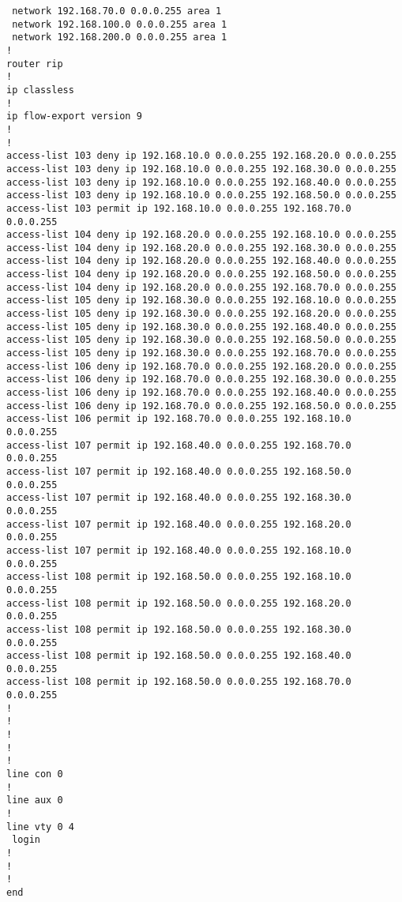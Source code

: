 \documentclass[a4paper,onecolumn,11pt]{article}
\begin{document}
{\begin{verbatim}
 network 192.168.70.0 0.0.0.255 area 1
 network 192.168.100.0 0.0.0.255 area 1
 network 192.168.200.0 0.0.0.255 area 1
!
router rip
!
ip classless
!
ip flow-export version 9
!
!
access-list 103 deny ip 192.168.10.0 0.0.0.255 192.168.20.0 0.0.0.255
access-list 103 deny ip 192.168.10.0 0.0.0.255 192.168.30.0 0.0.0.255
access-list 103 deny ip 192.168.10.0 0.0.0.255 192.168.40.0 0.0.0.255
access-list 103 deny ip 192.168.10.0 0.0.0.255 192.168.50.0 0.0.0.255
access-list 103 permit ip 192.168.10.0 0.0.0.255 192.168.70.0 0.0.0.255
access-list 104 deny ip 192.168.20.0 0.0.0.255 192.168.10.0 0.0.0.255
access-list 104 deny ip 192.168.20.0 0.0.0.255 192.168.30.0 0.0.0.255
access-list 104 deny ip 192.168.20.0 0.0.0.255 192.168.40.0 0.0.0.255
access-list 104 deny ip 192.168.20.0 0.0.0.255 192.168.50.0 0.0.0.255
access-list 104 deny ip 192.168.20.0 0.0.0.255 192.168.70.0 0.0.0.255
access-list 105 deny ip 192.168.30.0 0.0.0.255 192.168.10.0 0.0.0.255
access-list 105 deny ip 192.168.30.0 0.0.0.255 192.168.20.0 0.0.0.255
access-list 105 deny ip 192.168.30.0 0.0.0.255 192.168.40.0 0.0.0.255
access-list 105 deny ip 192.168.30.0 0.0.0.255 192.168.50.0 0.0.0.255
access-list 105 deny ip 192.168.30.0 0.0.0.255 192.168.70.0 0.0.0.255
access-list 106 deny ip 192.168.70.0 0.0.0.255 192.168.20.0 0.0.0.255
access-list 106 deny ip 192.168.70.0 0.0.0.255 192.168.30.0 0.0.0.255
access-list 106 deny ip 192.168.70.0 0.0.0.255 192.168.40.0 0.0.0.255
access-list 106 deny ip 192.168.70.0 0.0.0.255 192.168.50.0 0.0.0.255
access-list 106 permit ip 192.168.70.0 0.0.0.255 192.168.10.0 0.0.0.255
access-list 107 permit ip 192.168.40.0 0.0.0.255 192.168.70.0 0.0.0.255
access-list 107 permit ip 192.168.40.0 0.0.0.255 192.168.50.0 0.0.0.255
access-list 107 permit ip 192.168.40.0 0.0.0.255 192.168.30.0 0.0.0.255
access-list 107 permit ip 192.168.40.0 0.0.0.255 192.168.20.0 0.0.0.255
access-list 107 permit ip 192.168.40.0 0.0.0.255 192.168.10.0 0.0.0.255
access-list 108 permit ip 192.168.50.0 0.0.0.255 192.168.10.0 0.0.0.255
access-list 108 permit ip 192.168.50.0 0.0.0.255 192.168.20.0 0.0.0.255
access-list 108 permit ip 192.168.50.0 0.0.0.255 192.168.30.0 0.0.0.255
access-list 108 permit ip 192.168.50.0 0.0.0.255 192.168.40.0 0.0.0.255
access-list 108 permit ip 192.168.50.0 0.0.0.255 192.168.70.0 0.0.0.255
!
!
!
!
!
line con 0
!
line aux 0
!
line vty 0 4
 login
!
!
!
end
\end{verbatim}
}
\end{document}
